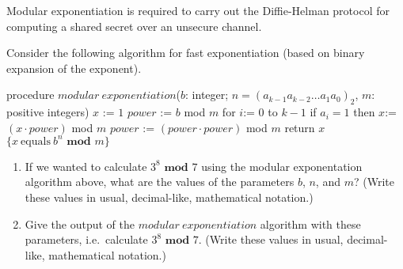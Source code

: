 
Modular exponentiation is required to carry out the Diffie-Helman protocol for 
computing a shared secret over an unsecure channel.

Consider the following algorithm for fast exponentiation (based on binary 
expansion of the exponent).

    \begin{algorithm}[caption={Modular Exponentation}]
    procedure $modular~exponentiation$($b$: integer; 
                 $n = (a_{k-1}a_{k-2} \ldots a_1 a_0)_2$, $m$: positive integers)
    $x$ := $1$
    $power$ := $b$ mod $m$
    for $i$:= $0$ to $k-1$
      if $a_i = 1$ then $x$:= $(x \cdot power)$ mod $m$
      $power$ := $(power \cdot power)$ mod $m$
    return $x$ $\{x~\textrm{equals}~b^n \textbf{ mod } m\} $
    \end{algorithm}
    
    \begin{enumerate}
        \item If we wanted to calculate $3^8 \textbf{ mod } 7$ 
        using the modular exponentation algorithm above, what are the values of 
        the parameters $b$, $n$, and $m$?  (Write these values in usual, 
        decimal-like, mathematical notation.)
        \item Give the output of the $modular~exponentiation$ algorithm 
        with these parameters, i.e.\ calculate $3^8 \textbf{ mod } 7$.
        (Write these values in usual, 
        decimal-like, mathematical notation.)
    \end{enumerate}